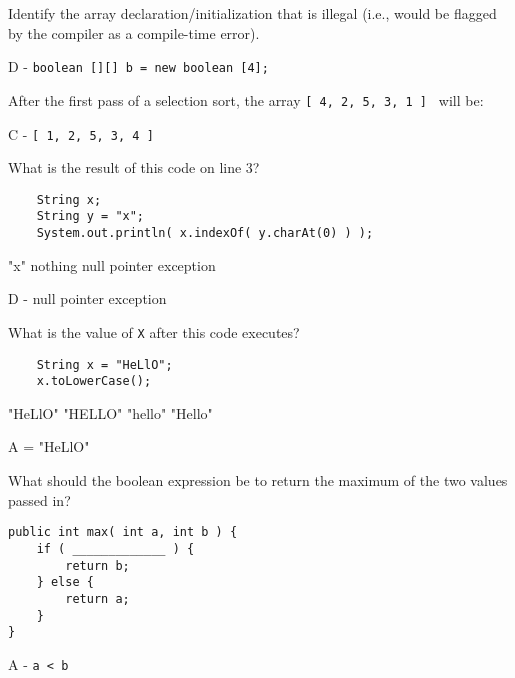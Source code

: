 \documentclass[11pt,answers]{exam}
\begin{document}
\begin{questions}
\makebox[4in]{\hrulefill}

\question[1] Identify the array declaration/initialization that is illegal (i.e., would be flagged by the compiler as a compile-time error).
\begin{choices}
\end{choices}
\begin{solution} D - {\tt boolean [][] b = new boolean [4]; } \end{solution}

\question[1] After the first pass of a selection sort, the array {\tt [ 4, 2, 5, 3, 1 ] } will be:
\begin{choices}
	\choice {\tt [ 4, 2, 1, 3, 5 ] }
	\choice {\tt [ 1, 2, 3, 4, 5 ] }
	\choice {\tt [ 1, 2, 5, 3, 4 ] } 
	\choice {\tt [ 4, 1, 2, 4, 5 ] }
\end{choices}
\begin{solution} C - {\tt [ 1, 2, 5, 3, 4 ] } \end{solution}

\newpage

\question[1] What is the result of this code on line 3?
\begin{lstlisting}
	String x;
	String y = "x";
	System.out.println( x.indexOf( y.charAt(0) ) );
\end{lstlisting}
\begin{oneparchoices}
	\choice "x"
	\choice nothing
	\choice null pointer exception
\end{oneparchoices}
\begin{solution} D - null pointer exception \end{solution}

\question[1] What is the value of {\tt X} after this code executes?
\begin{lstlisting}
	String x = "HeLlO";
	x.toLowerCase();
\end{lstlisting}
\begin{oneparchoices}
	\choice "HeLlO" \choice "HELLO" \choice "hello" \choice "Hello"
\end{oneparchoices}
\begin{solution}
	A = "HeLlO"
\end{solution}

\question[1] What should the boolean expression be to return the maximum of the two values passed in?
\begin{lstlisting}
public int max( int a, int b ) {
	if ( _____________ ) {
		return b;
	} else {
		return a;
	}
}	
\end{lstlisting}
\begin{oneparchoices}
	   
\end{oneparchoices}
\begin{solution}
	A - {\tt a < b}
\end{solution}


\end{questions}
\end{document}
